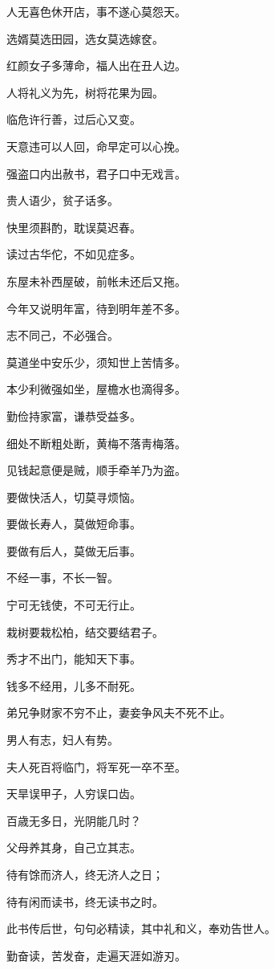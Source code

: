 \documentclass[12pt,oneside]{book}
\begin{document}
人无喜色休开店，事不遂心莫怨天。

选婿莫选田园，选女莫选嫁奁。

红颜女子多薄命，福人出在丑人边。

人将礼义为先，树将花果为园。

临危许行善，过后心又变。

天意违可以人回，命早定可以心挽。

强盗口内出赦书，君子口中无戏言。

贵人语少，贫子话多。

快里须斟酌，耽误莫迟春。

读过古华佗，不如见症多。

东屋未补西屋破，前帐未还后又拖。

今年又说明年富，待到明年差不多。

志不同己，不必强合。

莫道坐中安乐少，须知世上苦情多。

本少利微强如坐，屋檐水也滴得多。

勤俭持家富，谦恭受益多。

细处不断粗处断，黄梅不落靑梅落。

见钱起意便是贼，顺手牵羊乃为盗。

要做快活人，切莫寻烦恼。

要做长寿人，莫做短命事。

要做有后人，莫做无后事。

不经一事，不长一智。

宁可无钱使，不可无行止。

栽树要栽松柏，结交要结君子。

秀才不出门，能知天下事。

钱多不经用，儿多不耐死。

弟兄争财家不穷不止，妻妾争风夫不死不止。

男人有志，妇人有势。

夫人死百将临门，将军死一卒不至。

天旱误甲子，人穷误口齿。

百歳无多日，光阴能几时？

父母养其身，自己立其志。

待有馀而济人，终无济人之日；

待有闲而读书，终无读书之时。

此书传后世，句句必精读，其中礼和义，奉劝告世人。

勤奋读，苦发奋，走遍天涯如游刃。








\end{document}
